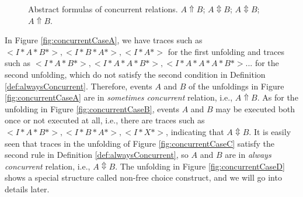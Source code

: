\documentclass[dvips,...]{llncs}
\begin{document}
\begin{figure}[htbp]
{\begin{minipage}[b]{0.3\textwidth}
	\end{minipage}
	\label{fig:concurrentCaseC}
}
\caption{Abstract formulas of concurrent relations.  $A\Uparrow B$;  $A\Updownarrow B$;  $A\Updownarrow B$;  $A\Uparrow B$.\label{fig:concurrentCases}}
\end{figure}

In Figure \ref{fig:concurrentCaseA}, we have traces such as $<I*A*B*>,<I*B*A*>,<I*A*>$ for the first unfolding and traces such as $<I*A*B*>,<I*A*A*B*>,<I*A*A*A*B*>...$ for the second unfolding, which do not satisfy the second condition in Definition \ref{def:alwaysConcurrent}. Therefore, events $A$ and $B$ of the unfoldings in Figure \ref{fig:concurrentCaseA} are in \textit{sometimes concurrent} relation, i.e., $A\Uparrow B$. As for the unfolding in Figure \ref{fig:concurrentCaseB}, events $A$ and $B$ may be executed both once or not executed at all, i.e., there are traces such as $<I*A*B*>,<I*B*A*>,<I*X*>$, indicating that $A\Updownarrow B$. It is easily seen that traces in the unfolding of Figure \ref{fig:concurrentCaseC} satisfy the second rule in Definition \ref{def:alwaysConcurrent}, so $A$ and $B$ are in \textit{always concurrent} relation, i.e., $A\Updownarrow B$. The unfolding in Figure \ref{fig:concurrentCaseD} shows a special structure called non-free choice construct, and we will go into details later.
\end{document}
